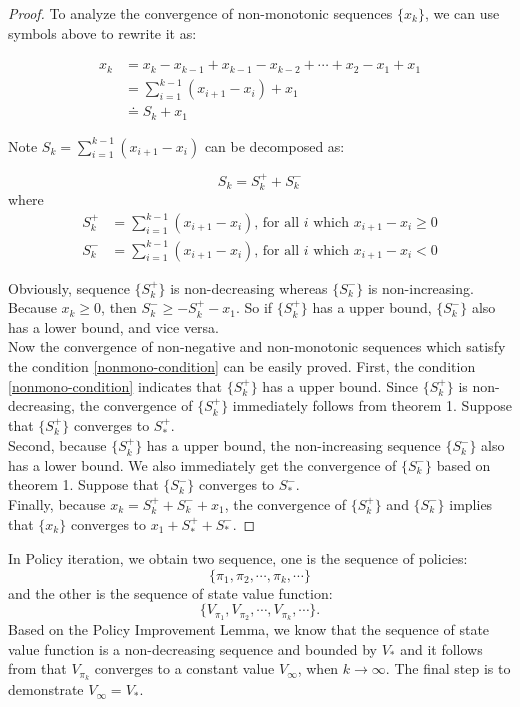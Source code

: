 \begin{proof}
	To analyze the convergence of non-monotonic sequences $\{x_{k}\}$, we can use symbols above to rewrite it as:

	\begin{align*}
		x_{k} & = x_{k} - x_{k-1} + x_{k-1} - x_{k-2}+\cdots + x_{2}-x_{1}+x_{1} \\
		      & = \sum_{i=1}^{k-1}(x_{i+1}-x_{i})+x_{1}                          \\
		      & \doteq S_{k} + x_{1}
	\end{align*}

	Note $S_{k}=\sum_{i=1}^{k-1}(x_{i+1}-x_{i})$ can be decomposed as:

	\begin{equation*}
		S_{k}=S_{k}^+ + S_{k}^-
	\end{equation*}
	where
	\begin{align*}
		S_{k}^+ & = \sum_{i=1}^{k-1}(x_{i+1}-x_{i})\text{, for all } i \text{ which }x_{i+1}-x_{i} \ge 0 \\
		S_{k}^- & =\sum_{i=1}^{k-1}(x_{i+1}-x_{i})\text{, for all } i \text{ which }x_{i+1}-x_{i}<0
	\end{align*}

	Obviously, sequence $\{S_{k}^+\}$ is non-decreasing whereas $\{S_{k}^-\}$ is non-increasing. \\[6pt]
	Because $x_{k}\ge 0$, then $S_{k}^-\ge - S_{k}^+ - x_{1}$. So if $\{S_{k}^+\}$ has a upper bound, $\{S_{k}^-\}$ also has a lower bound, and vice versa. \\[6pt]
	Now the convergence of non-negative and non-monotonic sequences which satisfy the condition \ref{nonmono-condition} can be easily proved.
	First, the condition \ref{nonmono-condition} indicates that $\{S_{k}^+\}$ has a upper bound. Since $\{S_{k}^+\}$ is non-decreasing, the convergence of $\{S_{k}^+\}$ immediately follows from theorem 1. Suppose that $\{S_{k}^+\}$ converges to $S_{*}^+$. \\[6pt]
	Second, because $\{S_{k}^+\}$ has a upper bound, the non-increasing sequence $\{S_{k}^-\}$ also has a lower bound.  We also immediately get the convergence of $\{S_{k}^-\}$ based on theorem 1. Suppose that $\{S_{k}^-\}$ converges to $S_{*}^-$. \\[6pt]
	Finally, because $x_{k}=S_{k}^+ + S_{k}^- +x_{1}$, the convergence of $\{S_{k}^+\}$ and $\{S_{k}^-\}$ implies that $\{x_k\}$ converges to $x_{1}+S_{*}^++S_{*}^-$.
\end{proof}
In Policy iteration, we obtain two sequence, one is the sequence of policies:
\[
	\{\pi_{1},\pi_{2}, \cdots, \pi_{k}, \cdots\}
\]and the other is the sequence of state value function:
\[
	\{V_{\pi_{1}},V_{\pi_{2}},\cdots,V_{\pi_{k}},\cdots\}.
\]Based on the Policy Improvement Lemma, we know that the sequence of state value function is a non-decreasing sequence and bounded by $V_{*}$
and it follows from  that $V_{\pi_{k}}$ converges to a constant value $V_{\infty}$, when $k \to \infty$. The final step is to
demonstrate $V_{\infty}=V_{*}$.

